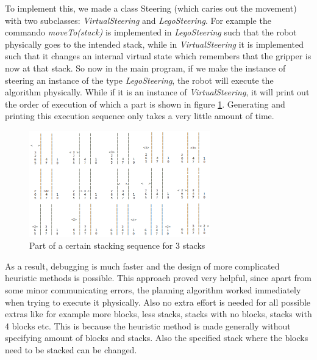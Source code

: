 \documentclass{article}
\begin{document}
	\par To implement this, we made a class Steering (which caries out the movement) with two subclasses: \textit{VirtualSteering} and \textit{LegoSteering}. 
	For example the commando \textit{moveTo(stack)} is implemented in \textit{LegoSteering} such that the robot physically goes to the intended stack, while in \textit{VirtualSteering} it is implemented such that it changes an internal virtual state which remembers that the gripper is now at that stack.
	So now in the main program, if we make the instance of steering an instance of the type \textit{LegoSteering}, the robot will execute the algorithm physically. While if it is an instance of \textit{VirtualSteering}, it will print out the order of execution of which a part is shown in figure \ref{fig:stacking_sequence}. Generating and printing this execution sequence only takes a very little amount of time.
	\begin{figure}[H]
		\centering
		\includegraphics[keepaspectratio, width=0.7\textwidth]{Figures/stacking_sequence.PNG}
		\caption{Part of a certain stacking sequence for 3 stacks}
		\label{fig:stacking_sequence}
	\end{figure}
	
	As a result, debugging is much faster and the design of more complicated heuristic methods is possible.
	This approach proved very helpful, since apart from some minor communicating errors, the planning algorithm worked immediately when trying to execute it physically.
	Also no extra effort is needed for all possible extras like for example more blocks, less stacks, stacks with no blocks, stacks with 4 blocks etc.
	This is because the heuristic method is made generally without specifying amount of blocks and stacks. Also the specified stack where the blocks need to be stacked can be changed.
	
\end{document}
